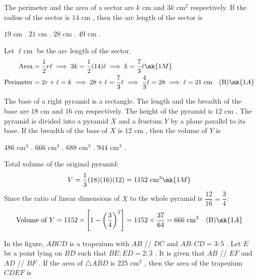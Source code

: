 
\question The perimeter and the area of a sector are $k\text{ cm}$ and $3k\text{ cm}^2$ respectively. If the radius of the sector is $14\text{ cm}$ , then the arc length of the sector is
\begin{choices}
    \choice $19\text{ cm}$ .
    \correctchoice $21\text{ cm}$ .
    \choice $28\text{ cm}$ .
    \choice $49\text{ cm}$ .
\end{choices}
\begin{solution}
Let $\ell\text{ cm}$ be the arc length of the sector.
\begin{align*}
\text{Area} &= \frac{1}{2}r\ell \implies 3k = \frac{1}{2}(14)\ell \implies k = \frac{7}{3}\ell \mk{1M} \\
\text{Perimeter} &= 2r + \ell = k \implies 28 + \ell = \frac{7}{3}\ell \implies \frac{4}{3}\ell = 28 \implies \ell = 21\text{ cm} \quad \text{(B)} \mk{1A}
\end{align*}
\end{solution}

\question The base of a right pyramid is a rectangle. The length and the breadth of the base are $18\text{ cm}$ and $16\text{ cm}$ respectively. The height of the pyramid is $12\text{ cm}$ . The pyramid is divided into a pyramid $X$ and a frustum $Y$ by a plane parallel to its base. If the breadth of the base of $X$ is $12\text{ cm}$ , then the volume of $Y$ is
\begin{choices}
    \choice $486\text{ cm}^3$ .
    \correctchoice $666\text{ cm}^3$ .
    \choice $688\text{ cm}^3$ .
    \choice $944\text{ cm}^3$ .
\end{choices}
\begin{solution}
Total volume of the original pyramid:
\[ V = \frac{1}{3}(18)(16)(12) = 1152\text{ cm}^3 \mk{1M} \]
Since the ratio of linear dimensions of $X$ to the whole pyramid is $\dfrac{12}{16} = \dfrac{3}{4}$:
\[ \text{Volume of } Y = 1152 \times \left[1 - \left(\frac{3}{4}\right)^3\right] = 1152 \times \frac{37}{64} = 666\text{ cm}^3 \quad \text{(B)} \mk{1A} \]
\end{solution}

\question In the figure, $ABCD$ is a trapezium with $AB$ // $DC$ and $AB : CD = 3 : 5$ . Let $E$ be a point lying on $BD$ such that $BE : ED = 2 : 3$ . It is given that $AB$ // $EF$ and $AD$ // $BF$ . If the area of $\triangle ABD$ is $225\text{ cm}^2$ , then the area of the trapezium $CDEF$ is

